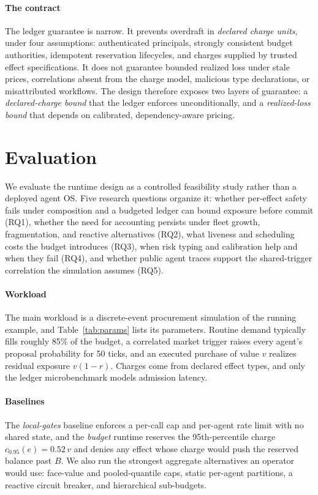 \documentclass[sigconf]{acmart}
\begin{document}
\paragraph{The contract} The ledger guarantee is narrow. It prevents overdraft in \emph{declared charge units}, under four assumptions: authenticated principals, strongly consistent budget authorities, idempotent reservation lifecycles, and charges supplied by trusted effect specifications. It does not guarantee bounded realized loss under stale prices, correlations absent from the charge model, malicious type declarations, or misattributed workflows. The design therefore exposes two layers of guarantee: a \emph{declared-charge bound} that the ledger enforces unconditionally, and a \emph{realized-loss bound} that depends on calibrated, dependency-aware pricing.

\section{Evaluation}
\label{sec:study}
We evaluate the runtime design as a controlled feasibility study rather than a deployed agent OS. Five research questions organize it: whether per-effect safety fails under composition and a budgeted ledger can bound exposure before commit (RQ1), whether the need for accounting persists under fleet growth, fragmentation, and reactive alternatives (RQ2), what liveness and scheduling costs the budget introduces (RQ3), when risk typing and calibration help and when they fail (RQ4), and whether public agent traces support the shared-trigger correlation the simulation assumes (RQ5).

\paragraph{Workload} The main workload is a discrete-event procurement simulation of the running example, and Table~\ref{tab:params} lists its parameters. Routine demand typically fills roughly 85\% of the budget, a correlated market trigger raises every agent's proposal probability for 50 ticks, and an executed purchase of value $v$ realizes residual exposure $v(1-r)$. Charges come from declared effect types, and only the ledger microbenchmark models admission latency.

\paragraph{Baselines} The \emph{local-gates} baseline enforces a per-call cap and per-agent rate limit with no shared state, and the \emph{budget} runtime reserves the 95th-percentile charge $c_{0.95}(e)=0.52\,v$ and denies any effect whose charge would push the reserved balance past $B$. We also run the strongest aggregate alternatives an operator would use: face-value and pooled-quantile caps, static per-agent partitions, a reactive circuit breaker, and hierarchical sub-budgets.
\end{document}
